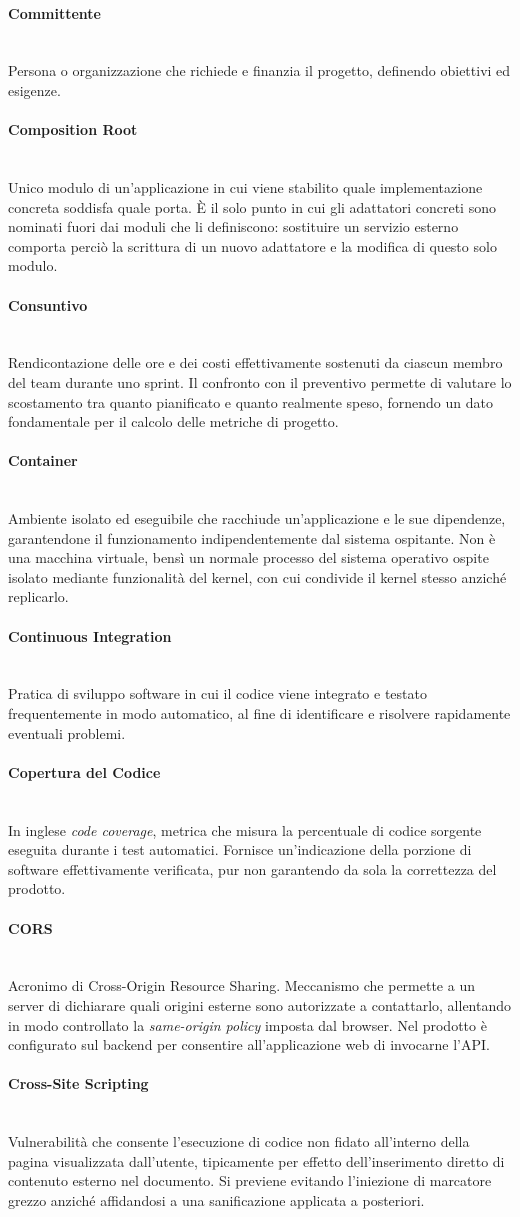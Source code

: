 \documentclass[a4paper, 10pt, colorlinks=true, linkcolor=black, urlcolor=blue, citecolor=blue, hidelinks]{article}
\newcommand{\glossaryterm}[2]{
    \paragraph{#1 \label{term:#1}} \mbox{} \\
    #2
    \vspace{0.5em}
}
\begin{document}
\glossaryterm{Committente}{Persona o organizzazione che richiede e finanzia il progetto, definendo obiettivi ed esigenze.}

\glossaryterm{Composition Root}{Unico modulo di un'applicazione in cui viene stabilito quale implementazione concreta soddisfa quale porta. È il solo punto in cui gli adattatori concreti sono nominati fuori dai moduli che li definiscono: sostituire un servizio esterno comporta perciò la scrittura di un nuovo adattatore e la modifica di questo solo modulo.}

\glossaryterm{Consuntivo}{Rendicontazione delle ore e dei costi effettivamente sostenuti da ciascun membro del team durante uno sprint. Il confronto con il preventivo permette di valutare lo scostamento tra quanto pianificato e quanto realmente speso, fornendo un dato fondamentale per il calcolo delle metriche di progetto.}

\glossaryterm{Container}{Ambiente isolato ed eseguibile che racchiude un'applicazione e le sue dipendenze, garantendone il funzionamento indipendentemente dal sistema ospitante. Non è una macchina virtuale, bensì un normale processo del sistema operativo ospite isolato mediante funzionalità del kernel, con cui condivide il kernel stesso anziché replicarlo.}

\glossaryterm{Continuous Integration}{Pratica di sviluppo software in cui il codice viene integrato e testato frequentemente in modo automatico, al fine di identificare e risolvere rapidamente eventuali problemi.}

\glossaryterm{Copertura del Codice}{In inglese \textit{code coverage}, metrica che misura la percentuale di codice sorgente eseguita durante i test automatici. Fornisce un'indicazione della porzione di software effettivamente verificata, pur non garantendo da sola la correttezza del prodotto.}

\glossaryterm{CORS}{Acronimo di Cross-Origin Resource Sharing. Meccanismo che permette a un server di dichiarare quali origini esterne sono autorizzate a contattarlo, allentando in modo controllato la \textit{same-origin policy} imposta dal browser. Nel prodotto è configurato sul backend per consentire all'applicazione web di invocarne l'API.}

\glossaryterm{Cross-Site Scripting}{Vulnerabilità che consente l'esecuzione di codice non fidato all'interno della pagina visualizzata dall'utente, tipicamente per effetto dell'inserimento diretto di contenuto esterno nel documento. Si previene evitando l'iniezione di marcatore grezzo anziché affidandosi a una sanificazione applicata a posteriori.}
\end{document}

